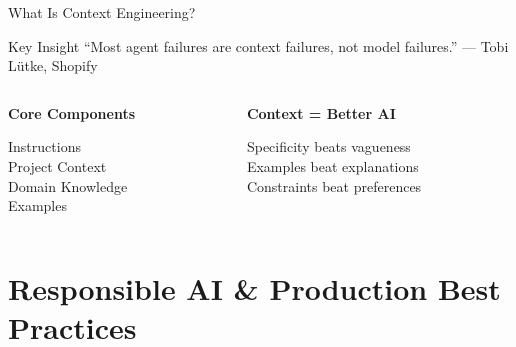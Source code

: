 \documentclass[aspectratio=169]{beamer}
\begin{document}
\begin{frame}{What Is Context Engineering?}
  \begin{block}{Key Insight \cite{lutke2024context}}
    ``Most agent failures are context failures, not model failures.'' --- Tobi Lütke, Shopify
  \end{block}

  \vspace{0.5cm}

  \begin{columns}[T]
    \begin{column}{0.48\textwidth}
      \centering
      \large\bfseries
      Core Components

      \vspace{0.3cm}
      \normalsize
      Instructions\\
      Project Context\\
      Domain Knowledge\\
      Examples
    \end{column}
    \begin{column}{0.48\textwidth}
      \centering
      \large\bfseries
      Context = Better AI

      \vspace{0.3cm}
      \normalsize
      Specificity beats vagueness\\
      Examples beat explanations\\
      Constraints beat preferences
    \end{column}
  \end{columns}
\end{frame}

\section{Responsible AI \& Production Best Practices}
\end{document}
